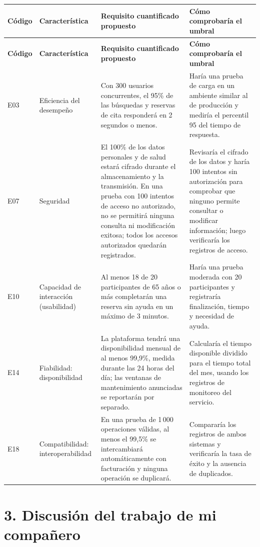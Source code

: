 \documentclass[10pt,letterpaper,landscape]{article}
\begin{document}
\small
\begin{longtable}{@{}p{0.55in}p{2.45in}p{2.10in}p{3.15in}@{}}
\toprule
\rowcolor{azulclaro}
\textbf{Código} & \textbf{Característica} & \textbf{Requisito cuantificado propuesto} & \textbf{Cómo comprobaría el umbral} \\
\midrule
\endfirsthead
\toprule
\rowcolor{azulclaro}
\textbf{Código} & \textbf{Característica} & \textbf{Requisito cuantificado propuesto} & \textbf{Cómo comprobaría el umbral} \\
\midrule
\endhead
\bottomrule
\endlastfoot
E03 & Eficiencia del desempeño & Con 300 usuarios concurrentes, el 95\% de las búsquedas y reservas de cita responderá en 2 segundos o menos. & Haría una prueba de carga en un ambiente similar al de producción y mediría el percentil 95 del tiempo de respuesta. \\
E07 & Seguridad & El 100\% de los datos personales y de salud estará cifrado durante el almacenamiento y la transmisión. En una prueba con 100 intentos de acceso no autorizado, no se permitirá ninguna consulta ni modificación exitosa; todos los accesos autorizados quedarán registrados. & Revisaría el cifrado de los datos y haría 100 intentos sin autorización para comprobar que ninguno permite consultar o modificar información; luego verificaría los registros de acceso. \\
E10 & Capacidad de interacción (usabilidad) & Al menos 18 de 20 participantes de 65 años o más completarán una reserva sin ayuda en un máximo de 3 minutos. & Haría una prueba moderada con 20 participantes y registraría finalización, tiempo y necesidad de ayuda. \\
E14 & Fiabilidad: disponibilidad & La plataforma tendrá una disponibilidad mensual de al menos 99,9\%, medida durante las 24 horas del día; las ventanas de mantenimiento anunciadas se reportarán por separado. & Calcularía el tiempo disponible dividido para el tiempo total del mes, usando los registros de monitoreo del servicio. \\
E18 & Compatibilidad: interoperabilidad & En una prueba de 1\,000 operaciones válidas, al menos el 99,5\% se intercambiará automáticamente con facturación y ninguna operación se duplicará. & Compararía los registros de ambos sistemas y verificaría la tasa de éxito y la ausencia de duplicados. \\
\end{longtable}
\normalsize

\section*{3. Discusión del trabajo de mi compañero}
\end{document}
